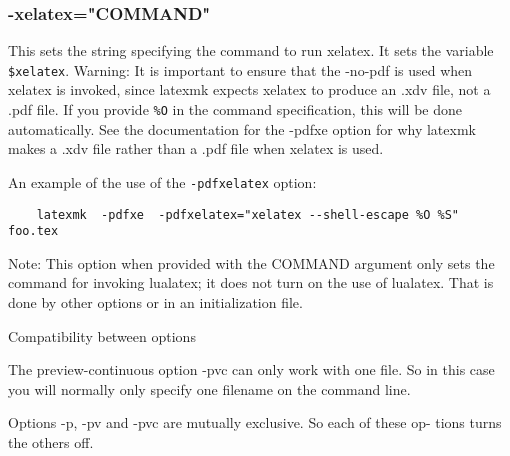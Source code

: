 \subsubsection{-xelatex="COMMAND"}

This  sets the string specifying the command to run xelatex.  It sets the
variable \verb|$xelatex|.  Warning: It is important to ensure that the -no-pdf is used
when xelatex  is invoked, since latexmk expects xelatex to produce an .xdv
file, not a .pdf file. If you provide  \verb|%O|  in  the  command specification,
this  will be done automatically.  See the documentation for the -pdfxe
option for why  latexmk  makes  a  .xdv file rather than a .pdf file when
xelatex is used.

An example of the use of the \verb|-pdfxelatex| option:

\begin{verbatim}
	latexmk  -pdfxe  -pdfxelatex="xelatex --shell-escape %O %S" foo.tex
\end{verbatim}

Note: This option when provided with the COMMAND  argument  only sets  the
command for invoking lualatex; it does not turn on the use of lualatex. That is
done by other options or in an initialization file.

Compatibility between options

The  preview-continuous option -pvc can only work with one file.  So in
this case you will normally only specify one filename  on  the  command
line.

Options  -p, -pv and -pvc are mutually exclusive.  So each of these op- tions
turns the others off.



